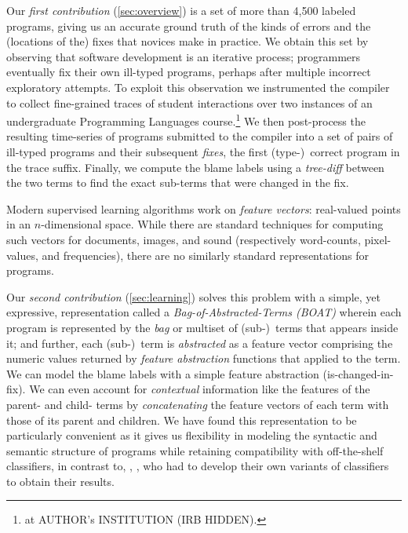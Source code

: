 Our \emph{first contribution} (\autoref{sec:overview})
is a set of more than 4,500 labeled programs,
giving us an accurate ground truth of
the kinds of errors and the (locations
of the) fixes that novices make in
practice.
%
We obtain this set by observing that
software development is an iterative
process; programmers eventually
fix their own ill-typed programs,
perhaps after multiple incorrect
exploratory attempts.
%
To exploit this observation we instrumented
the \ocaml compiler to collect fine-grained
traces of student interactions over two instances
of an undergraduate Programming Languages
course.\footnote{
at AUTHOR's INSTITUTION (IRB HIDDEN).
}
%
We then post-process the resulting time-series
of programs submitted to the \ocaml compiler into
a set of pairs of ill-typed programs and their
subsequent \emph{fixes}, the first (type-)~correct
program in the trace suffix.
%
Finally, we compute the blame labels using a
\emph{tree-diff} between the two terms to find
the exact sub-terms that were changed in the fix.

%
Modern supervised learning algorithms work on %
\emph{feature vectors}: real-valued points in an
$n$-dimensional space. While there are standard
techniques for computing such
vectors for documents, images, and sound (respectively
word-counts, pixel-values, and frequencies),
there are no similarly standard representations for
programs.

Our \emph{second contribution} (\autoref{sec:learning})
solves this problem with a simple, yet expressive, representation called
a \emph{Bag-of-Abstracted-Terms (BOAT)} wherein
each program is represented by the \emph{bag}
or multiset of (sub-)~terms that appears inside
it; and further, each (sub-)~term is \emph{abstracted}
as a feature vector comprising the numeric values
returned by \emph{feature abstraction} functions
that applied to the term.
%
We can model the blame labels with a simple feature
abstraction (\eg is-changed-in-fix).
%
We can even account for \emph{contextual} information
like the features of the parent- and child- terms by
\emph{concatenating} the feature vectors of each term
with those of its parent and children.
%
We have found this representation to be particularly
convenient as it gives us flexibility in modeling the
syntactic and semantic structure of programs while
retaining compatibility with off-the-shelf classifiers,
in contrast to, \eg, \citet{Raychev2015-jg}, who had
to develop their own variants of classifiers to obtain
their results.

